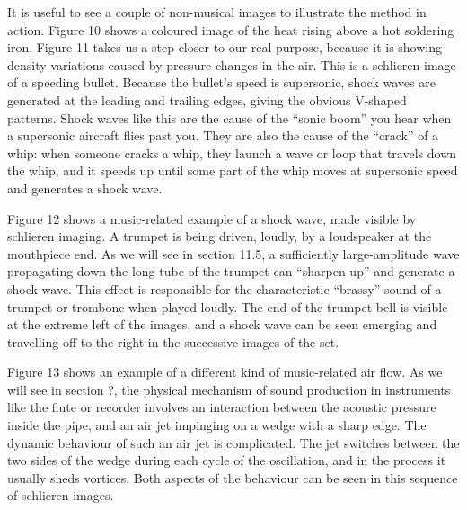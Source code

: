   It is useful to see a couple of non-musical images to illustrate the method 
  in action. Figure 10 shows a coloured image of the heat rising above a hot 
  soldering iron. Figure 11 takes us a step closer to our real purpose, because 
  it is showing density variations caused by pressure changes in the air. This 
  is a schlieren image of a speeding bullet. Because the bullet’s speed is 
  supersonic, shock waves are generated at the leading and trailing edges, 
  giving the obvious V-shaped patterns. Shock waves like this are the cause of 
  the “sonic boom” you hear when a supersonic aircraft flies past you. They are 
  also the cause of the ``crack'' of a whip: when someone cracks a whip, they 
  launch a wave or loop that travels down the whip, and it speeds up until some 
  part of the whip moves at supersonic speed and generates a shock wave. 

  Figure 12 shows a music-related example of a shock wave, made visible by 
  schlieren imaging. A trumpet is being driven, loudly, by a loudspeaker at the 
  mouthpiece end. As we will see in section 11.5, a sufficiently 
  large-amplitude wave propagating down the long tube of the trumpet can 
  “sharpen up” and generate a shock wave. This effect is responsible for the 
  characteristic “brassy” sound of a trumpet or trombone when played loudly. 
  The end of the trumpet bell is visible at the extreme left of the images, and 
  a shock wave can be seen emerging and travelling off to the right in the 
  successive images of the set. 


  Figure 13 shows an example of a different kind of music-related air flow. As 
  we will see in section ?, the physical mechanism of sound production in 
  instruments like the flute or recorder involves an interaction between the 
  acoustic pressure inside the pipe, and an air jet impinging on a wedge with a 
  sharp edge. The dynamic behaviour of such an air jet is complicated. The jet 
  switches between the two sides of the wedge during each cycle of the 
  oscillation, and in the process it usually sheds vortices. Both aspects of 
  the behaviour can be seen in this sequence of schlieren images. 



